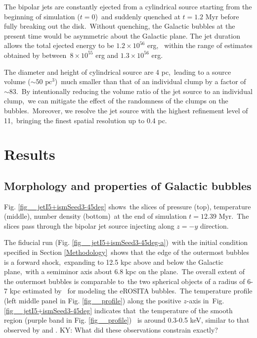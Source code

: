 \documentclass[fleqn,usenatbib,useAMS]{mnras}
\begin{document}
  The bipolar jets are constantly ejected from a cylindrical source starting from the beginning of simulation ($t=0$)\
  and suddenly quenched at $t=1.2$ Myr before fully breaking out the disk.\
  Without quenching, the Galactic bubbles at the present time would be asymmetric about the Galactic plane.
  The jet duration allows the total ejected energy to be $1.2\times10^{56}$ erg, \
  within the range of estimates obtained by \citet{Predehl2020} between\
  $8\times10^{55}$ erg and $1.3\times10^{56}$ erg.



  The diameter and height of cylindrical source are 4 pc,\
  leading to a source volume ($\sim 50 \text{ pc}^{3}$)\
  much smaller than that of an individual clump by a factor of $\sim 83$.\
  By intentionally reducing the volume ratio of the jet source to an individual clump,\
  we can mitigate the effect of the randomness of the clumps on the bubbles.\
  Moreover, we resolve the jet source with the highest refinement level of 11,\
  bringing the finest spatial resolution up to 0.4 pc.\

\section{Results}
\label{Results}

\subsection{Morphology and properties of Galactic bubbles}

 Fig. \ref{fig__jetI5+ismSeed3-45deg} shows\
 the slices of pressure (top), temperature (middle), number density (bottom)\
 at the end of simulation $t=12.39$ Myr.\
 The slices pass through the bipolar jet source injecting along $z=-y$ direction.

 The fiducial run (Fig. \ref{fig__jetI5+ismSeed3-45deg-a})\
 with the initial condition specified in Section \ref{Methodology}\
 shows that the edge of the outermost bubbles is a forward shock,\
 expanding to 12.5 kpc above and below the Galactic plane,\
 with a semiminor axis about 6.8 kpc on the plane.\
 The overall extent of the outermost bubbles is comparable to\
 the two spherical objects of a radius of 6-7 kpc estimated by \citet{Predehl2020}\
 for modeling the eROSITA bubbles.\
 The temperature profile (left middle panel in Fig. \ref{fig__profile}) along the positive $z$-axis in\
 Fig. \ref{fig__jetI5+ismSeed3-45deg} indicates that\
 the temperature of the smooth region (purple band in Fig. \ref{fig__profile})\ %
 is around 0.3-0.5 keV, similar to that observed by \citet{Miller2016} and \citet{Kataoka2018}. {\color{red} KY: What did these observations constrain exactly?}
\end{document}

